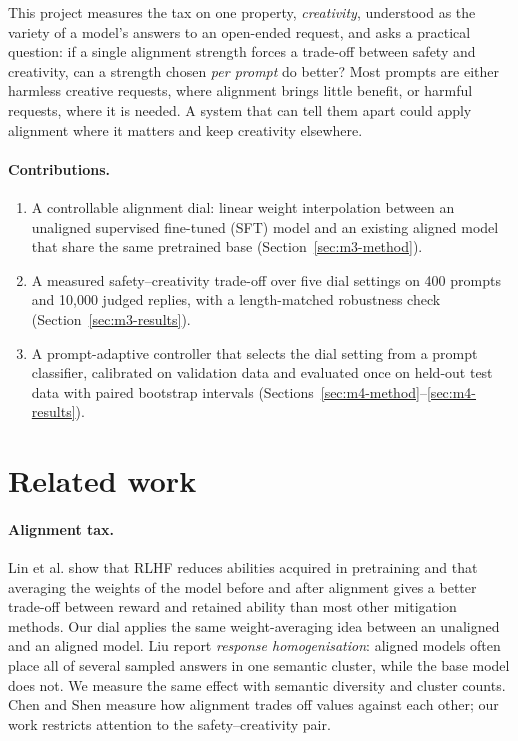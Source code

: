\documentclass[11pt,a4paper]{article}
\begin{document}
This project measures the tax on one property, \emph{creativity}, understood as the variety of a model's answers to an open-ended request, and asks a practical question: if a single alignment strength forces a trade-off between safety and creativity, can a strength chosen \emph{per prompt} do better? Most prompts are either harmless creative requests, where alignment brings little benefit, or harmful requests, where it is needed. A system that can tell them apart could apply alignment where it matters and keep creativity elsewhere.

\paragraph{Contributions.}
\begin{enumerate}
  \item A controllable alignment dial: linear weight interpolation between an unaligned supervised fine-tuned (SFT) model and an existing aligned model that share the same pretrained base (Section~\ref{sec:m3-method}).
  \item A measured safety--creativity trade-off over five dial settings on 400 prompts and 10{,}000 judged replies, with a length-matched robustness check (Section~\ref{sec:m3-results}).
  \item A prompt-adaptive controller that selects the dial setting from a prompt classifier, calibrated on validation data and evaluated once on held-out test data with paired bootstrap intervals (Sections~\ref{sec:m4-method}--\ref{sec:m4-results}).
\end{enumerate}

\section{Related work}

\paragraph{Alignment tax.} Lin et al.\cite{lin2024mitigating} show that RLHF reduces abilities acquired in pretraining and that averaging the weights of the model before and after alignment gives a better trade-off between reward and retained ability than most other mitigation methods. Our dial applies the same weight-averaging idea between an unaligned and an aligned model. Liu\cite{liu2026homogenization} report \emph{response homogenisation}: aligned models often place all of several sampled answers in one semantic cluster, while the base model does not. We measure the same effect with semantic diversity and cluster counts. Chen and Shen\cite{chen2026value} measure how alignment trades off values against each other; our work restricts attention to the safety--creativity pair.
\end{document}
